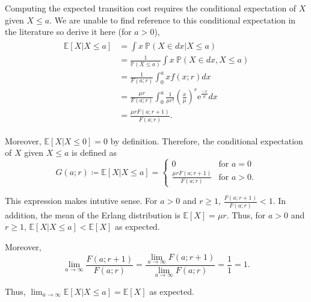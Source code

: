 Computing the expected transition cost requires the conditional expectation of $X$ given $X \leq a$. We are unable to find reference to this conditional expectation in the literature so derive it here (for $a > 0$),
\begin{align}
	\begin{split}
		\mathbb{E} [X | X \leq a]
		& = \int x \ \mathbb{P} (X \in d x | X \leq a) \\
		& = \frac{1}{\mathbb{P} (X \leq a)} \int x \ \mathbb{P} (X \in d x, X \leq a) \\
		& = \frac{1}{F (a; r)} \int_{0}^{a} x f(x; r) d x \\
		& = \frac{\mu r}{F (a; r)} \int_{0}^{a} \frac{1}{\mu r!} \left( \frac{x}{\mu} \right)^{r} \mathrm{e}^{\frac{-x}{\mu}} d x \\
		& = \frac{\mu r F (a; r + 1)}{F (a; r)}.
	\end{split}
\end{align}

Moreover, $\mathbb{E} [X | X \leq 0] = 0$ by definition. Therefore, the conditional expectation of $X$ given $X \leq a$ is defined as
\begin{equation}
	G (a; r) \coloneqq \mathbb{E} [X | X \leq a] = \begin{cases} 0 & \text{for $a = 0$} \\ \frac{\mu r F (a; r + 1)}{F (a; r)} & \text{for $a > 0$}. \end{cases}
\end{equation}

This expression makes intutive sense. For $a > 0$ and $r \geq 1$, $\frac{F (a; r + 1)}{F (a; r)} < 1$. In addition, the mean of the Erlang distribution is $\mathbb{E} [X] = \mu r$. Thus, for $a > 0$ and $r \geq 1$, $\mathbb{E} [X | X \leq a] < \mathbb{E} [X]$ as expected.

Moreover, 
\begin{equation}
	\lim_{a \to \infty} \frac{F (a; r + 1)}{F (a; r)} = \frac{\displaystyle \lim_{a \to \infty} F (a; r + 1)}{\displaystyle \lim_{a \to \infty} F (a; r)} = \frac{1}{1} = 1.
\end{equation}

Thus, $\displaystyle \lim_{a \to \infty} \mathbb{E} [X | X \leq a] = \mathbb{E} [X]$ as expected.

